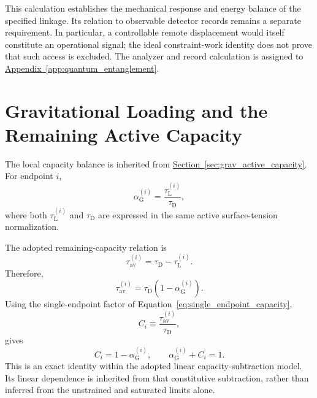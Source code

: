 This calculation establishes the mechanical response and energy balance of the specified linkage. Its relation to observable detector records remains a separate requirement. In particular, a controllable remote displacement would itself constitute an operational signal; the ideal constraint-work identity does not prove that such access is excluded. The analyzer and record calculation is assigned to \hyperref[app:quantum_entanglement]{Appendix~\ref*{app:quantum_entanglement}}.

\section{Gravitational Loading and the Remaining Active Capacity}

The local capacity balance is inherited from \hyperref[sec:grav_active_capacity]{Section~\ref*{sec:grav_active_capacity}}. For endpoint $i$,
\begin{equation}
    \alpha_{\mathrm G}^{(i)}
    =\frac{\tau_{\mathrm L}^{(i)}}{\tau_{\mathrm D}},
\end{equation}
where both $\tau_{\mathrm L}^{(i)}$ and $\tau_{\mathrm D}$ are expressed in the same active surface-tension normalization.

The adopted remaining-capacity relation is
\begin{equation}
    \tau_{\mathrm{av}}^{(i)}
    =\tau_{\mathrm D}-\tau_{\mathrm L}^{(i)}.
\end{equation}
Therefore,
\begin{equation}
    \boxed{
    \tau_{\mathrm{av}}^{(i)}
    =\tau_{\mathrm D}(1-\alpha_{\mathrm G}^{(i)})
    }.
\end{equation}
Using the single-endpoint factor of Equation~\eqref{eq:single_endpoint_capacity},
\begin{equation}
    C_i\equiv\frac{\tau_{\mathrm{av}}^{(i)}}{\tau_{\mathrm D}},
\end{equation}
gives
\begin{equation}
    \boxed{
    C_i=1-\alpha_{\mathrm G}^{(i)},
    \qquad
    \alpha_{\mathrm G}^{(i)}+C_i=1
    }.
\end{equation}
This is an exact identity within the adopted linear capacity-subtraction model. Its linear dependence is inherited from that constitutive subtraction, rather than inferred from the unstrained and saturated limits alone.

